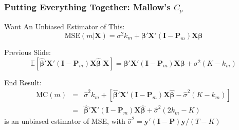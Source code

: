 \begin{frame}
  \frametitle{Putting Everything Together: Mallow's $C_p$}

  \begin{block}{Want An Unbiased Estimator of This:}
    \vspace{-1em}
  \[\text{MSE}(m|\mathbf{X}) = \sigma^2 k_m + \boldsymbol{\beta}'\mathbf{X}'(\mathbf{I} - \mathbf{P}_m)\mathbf{X}\boldsymbol{\beta}\]
\end{block}

\vspace{-1em}
\begin{block}{Previous Slide:}
  \vspace{-1em}
  \[
    \mathbb{E}\left[ \widehat{\boldsymbol{\beta}}'\mathbf{X}'(\mathbf{I} - \mathbf{P}_m) \mathbf{X}\widehat{\boldsymbol{\beta}}|\mathbf{X}\right] = \boldsymbol{\beta}' \mathbf{X}' (\mathbf{I} - \mathbf{P}_m)\mathbf{X} \boldsymbol{\beta} + \sigma^2(K - k_m)
   \]
 \end{block}

 \pause

 \begin{alertblock}{End Result:}
   \vspace{-2.5em}
   \begin{eqnarray*}
     \text{MC}(m) &=& \widehat{\sigma}^2 k_m  + \left[ \widehat{\boldsymbol{\beta}}'\mathbf{X}'(\mathbf{I} - \mathbf{P}_m)\mathbf{X}\widehat{\boldsymbol{\beta}} - \widehat{\sigma}^2 (K - k_m) \right]\\
     &=& \widehat{\boldsymbol{\beta}}'\mathbf{X}'(\mathbf{I} - \mathbf{P}_m)\mathbf{X}\widehat{\boldsymbol{\beta}} + \widehat{\sigma}^2(2 k_m - K) 
   \end{eqnarray*}
   is an \alert{unbiased estimator of MSE}, with $\widehat{\sigma}^2 = \mathbf{y}'(\mathbf{I} - \mathbf{P})\mathbf{y}/(T-K)$
 \end{alertblock}

\end{frame}
